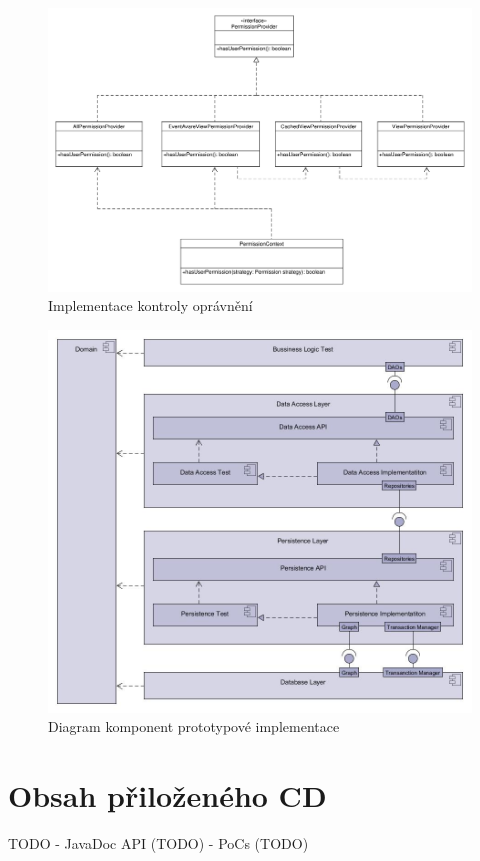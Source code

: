 \documentclass[11pt,twoside,a4paper]{book}
\begin{document}
\begin{figure}
\begin{center}
\includegraphics[width=1.3\linewidth, angle=90]{figures/permission-class}
\caption{Implementace kontroly oprávnění}
\label{fig:impl-permission}
\end{center}
\end{figure}

\begin{figure}
\begin{center}
\includegraphics[width=14cm]{figures/modules}
\caption{Diagram komponent prototypové implementace}
\label{fig:poc_components}
\end{center}
\end{figure}

\chapter{Obsah přiloženého CD}
\label{apx:cd}
TODO
- JavaDoc API (TODO)
- PoCs (TODO)
\end{document}
